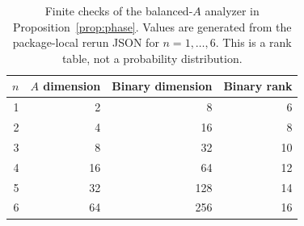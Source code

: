 \begin{table}[ht]\centering
\begin{tabular}{rrrr}\toprule
$n$ & $A$ dimension & Binary dimension & Binary rank\\\midrule
1 & 2 & 8 & 6\\
2 & 4 & 16 & 8\\
3 & 8 & 32 & 10\\
4 & 16 & 64 & 12\\
5 & 32 & 128 & 14\\
6 & 64 & 256 & 16\\
\bottomrule\end{tabular}
\caption{Finite checks of the balanced-$A$ analyzer in Proposition~\ref{prop:phase}. Values are generated from the package-local rerun JSON for $n=1,\ldots,6$. This is a rank table, not a probability distribution.}\label{tab:phase}
\end{table}
